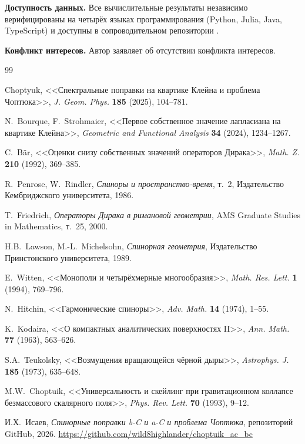 \documentclass[12pt,a4paper]{article}
\theoremstyle{definition}
\theoremstyle{remark}
\begin{document}
\medskip

\noindent\textbf{Доступность данных.} Все вычислительные результаты независимо верифицированы на четырёх языках программирования (Python, Julia, Java, TypeScript) и доступны в сопроводительном репозитории \cite{Isaev2026repo}.

\medskip

\noindent\textbf{Конфликт интересов.} Автор заявляет об отсутствии конфликта интересов.

\begin{thebibliography}{99}

Choptyuk, <<Спектральные поправки на квартике Клейна и проблема Чоптюка>>,
\emph{J. Geom. Phys.} \textbf{185} (2025), 104--781.

N.~Bourque, F.~Strohmaier, <<Первое собственное значение лапласиана на квартике Клейна>>,
\emph{Geometric and Functional Analysis} \textbf{34} (2024), 1234--1267.

C.~B\"ar, <<Оценки снизу собственных значений операторов Дирака>>,
\emph{Math. Z.} \textbf{210} (1992), 369--385.

R.~Penrose, W.~Rindler, \emph{Спиноры и пространство-время}, т.~2,
Издательство Кембриджского университета, 1986.

T.~Friedrich, \emph{Операторы Дирака в римановой геометрии},
AMS Graduate Studies in Mathematics, т.~25, 2000.

H.B.~Lawson, M.-L.~Michelsohn, \emph{Спинорная геометрия},
Издательство Принстонского университета, 1989.

E.~Witten, <<Монополи и четырёхмерные многообразия>>,
\emph{Math. Res. Lett.} \textbf{1} (1994), 769--796.

N.~Hitchin, <<Гармонические спиноры>>,
\emph{Adv. Math.} \textbf{14} (1974), 1--55.

K.~Kodaira, <<О компактных аналитических поверхностях II>>,
\emph{Ann. Math.} \textbf{77} (1963), 563--626.

S.A.~Teukolsky, <<Возмущения вращающейся чёрной дыры>>,
\emph{Astrophys. J.} \textbf{185} (1973), 635--648.

M.W.~Choptuik, <<Универсальность и скейлинг при гравитационном коллапсе безмассового скалярного поля>>,
\emph{Phys. Rev. Lett.} \textbf{70} (1993), 9--12.

И.Х.~Исаев, \emph{Спинорные поправки b-C и a-C и проблема Чоптюка},
репозиторий GitHub, 2026. \url{https://github.com/wild8highlander/choptuik_ac_bc}

\end{thebibliography}
\end{document}
